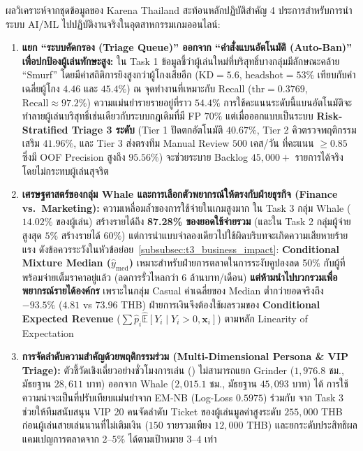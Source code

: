 ผลวิเคราะห์จากชุดข้อมูลของ Karena Thailand สะท้อนหลักปฏิบัติสำคัญ 4 ประการสำหรับการนำระบบ AI/ML ไปปฏิบัติงานจริงในอุตสาหกรรมเกมออนไลน์:

\begin{enumerate}
  \item \textbf{แยก ``ระบบคัดกรอง (Triage Queue)'' ออกจาก ``คำสั่งแบนอัตโนมัติ (Auto-Ban)'' เพื่อปกป้องผู้เล่นทักษะสูง:}
  ใน Task 1 ข้อมูลชี้ว่าผู้เล่นใหม่ที่บริสุทธิ์บางกลุ่มมีลักษณะคล้าย ``Smurf'' โดยมีค่าสถิติการยิงสูงกว่าผู้โกงเสียอีก ($\text{KD} = 5.6$, $\text{headshot} = 53\%$ เทียบกับค่าเฉลี่ยผู้โกง $4.46$ และ $45.4\%$) ณ จุดทำงานที่เหมาะกับ Recall ($\text{thr}=0.3769$, $\text{Recall} \approx 97.2\%$) ความแม่นยำรายรายอยู่ที่ราว $54.4\%$ การใช้คะแนนระดับนี้แบนอัตโนมัติจะทำลายผู้เล่นบริสุทธิ์เช่นเดียวกับระบบกฎเดิมที่มี FP $70\%$ แต่เมื่อออกแบบเป็นระบบ \textbf{Risk-Stratified Triage 3 ระดับ} (Tier 1 ปัดตกอัตโนมัติ $40.67\%$, Tier 2 คิวตรวจพฤติกรรมเสริม $41.96\%$, และ Tier 3 ส่งตรงทีม Manual Review $500$ เคส/วัน ที่คะแนน $\ge 0.85$ ซึ่งมี OOF Precision สูงถึง $95.56\%$) จะช่วยระบาย Backlog $45{,}000+$ รายการได้จริงโดยไม่กระทบผู้เล่นสุจริต

  \item \textbf{เศรษฐศาสตร์ของกลุ่ม Whale และการเลือกตัวพยากรณ์ให้ตรงกับฝ่ายธุรกิจ (Finance vs.\ Marketing):}
  ความเหลื่อมล้ำของการใช้จ่ายในเกมสูงมาก ใน Task 3 กลุ่ม Whale ($14.02\%$ ของผู้เล่น) สร้างรายได้ถึง \textbf{87.28\% ของยอดใช้จ่ายรวม} (และใน Task 2 กลุ่มผู้จ่ายสูงสุด $5\%$ สร้างรายได้ $60\%$) แต่การนำแบบจำลองเดียวไปใช้ผิดบริบทจะเกิดความเสียหายร้ายแรง ดังข้อควรระวังในหัวข้อย่อย~\ref{subsubsec:t3_business_impact}: \textbf{Conditional Mixture Median ($\hat{y}_{\text{med}}$)} เหมาะสำหรับฝ่ายการตลาดในการระงับคูปองลด 50\% กับผู้ที่พร้อมจ่ายเต็มราคาอยู่แล้ว (ลดการรั่วไหลกว่า $6$ ล้านบาท/เดือน) \textbf{แต่ห้ามนำไปบวกรวมเพื่อพยากรณ์รายได้องค์กร} เพราะในกลุ่ม Casual ค่าเฉลี่ยของ Median ต่ำกว่ายอดจริงถึง $-93.5\%$ ($4.81$ vs $73.96$ THB) ฝ่ายการเงินจึงต้องใช้ผลรวมของ \textbf{Conditional Expected Revenue} ($\sum \hat{p}_i \widehat{\mathbb{E}}[Y_i \mid Y_i > 0, \mathbf{x}_i]$) ตามหลัก Linearity of Expectation

  \item \textbf{การจัดลำดับความสำคัญด้วยพฤติกรรมร่วม (Multi-Dimensional Persona \& VIP Triage):}
  ตัวชี้วัดเชิงเดี่ยวอย่างชั่วโมงการเล่น () ไม่สามารถแยก Grinder ($1{,}976.8$ ชม., มัธยฐาน $28{,}611$ บาท) ออกจาก Whale ($2{,}015.1$ ชม., มัธยฐาน $45{,}093$ บาท) ได้ การใช้ความน่าจะเป็นที่ปรับเทียบแม่นยำจาก EM-NB (Log-Loss $0.5975$) ร่วมกับ  จาก Task 3 ช่วยให้ทีมสนับสนุน VIP 20 คนจัดลำดับ Ticket ของผู้เล่นมูลค่าสูงระดับ $255{,}000$ THB ก่อนผู้เล่นสายเล่นนานที่ไม่เติมเงิน ($150$ รายรวมเพียง $12{,}000$ THB) และยกระดับประสิทธิผลแคมเปญการตลาดจาก $2\text{--}5\%$ ได้ตามเป้าหมาย $3\text{--}4$ เท่า


\end{enumerate}
